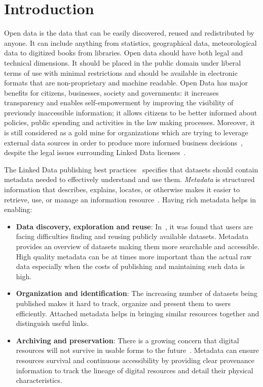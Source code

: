 \documentclass[runningheads,a4paper]{../../Tools/LaTEX/llncs}
\begin{document}
\section{Introduction}
\label{sec:introduction}
Open data is the data that can be easily discovered, reused and redistributed by anyone. It can include anything from statistics, geographical data, meteorological data to digitized books from libraries. Open data should have both legal and technical dimensions. It should be placed in the public domain under liberal terms of use with minimal restrictions and should be available in electronic formats that are non-proprietary and machine readable. Open Data has major benefits for citizens, businesses, society and governments: it increases transparency and enables self-empowerment by improving the visibility of previously inaccessible information; it allows citizens to be better informed about policies, public spending and activities in the law making processes. Moreover, it is still considered as a gold mine for organizations which are trying to leverage external data sources in order to produce more informed business decisions~\cite{Boyd:Article:11}, despite the legal issues surrounding Linked Data licenses~\cite{Prateek:Misc:13}.

The Linked Data publishing best practices~\cite{Bizer:DB:11} specifies that datasets should contain metadata needed to effectively understand and use them. \textit{Metadata} is structured information that describes, explains, locates, or otherwise makes it easier to retrieve, use, or manage an information resource~\cite{NISO:TechReport:04}. Having rich metadata helps in enabling:
\begin{itemize}
  \item \textbf{Data discovery, exploration and reuse}: In~\cite{Graham:TechReport:11}, it was found that users are facing difficulties finding and reusing publicly available datasets. Metadata provides an overview of datasets making them more searchable and accessible. High quality metadata can be at times more important than the actual raw data especially when the costs of publishing and maintaining such data is high.
  \item \textbf{Organization and identification}: The increasing number of datasets being published makes it hard to track, organize and present them to users efficiently. Attached metadata helps in bringing similar resources together and distinguish useful links.
  \item \textbf{Archiving and preservation}: There is a growing concern that digital resources will not survive in usable forms to the future~\cite{NISO:TechReport:04}. Metadata can ensure resources survival and continuous accessibility by providing clear provenance information to track the lineage of digital resources and detail their physical characteristics.
\end{itemize}
\end{document}
